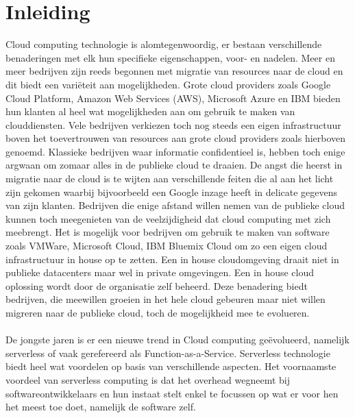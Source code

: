 \chapter{Inleiding}
\label{ch:inleiding}

Cloud computing technologie is alomtegenwoordig, er bestaan verschillende benaderingen met elk hun specifieke eigenschappen, voor- en nadelen. Meer en meer bedrijven zijn reeds begonnen met migratie van resources naar de cloud en dit biedt een variëteit aan mogelijkheden. Grote cloud providers zoals Google Cloud Platform, Amazon Web Services (AWS), Microsoft Azure en IBM bieden hun klanten al heel wat mogelijkheden aan om gebruik te maken van clouddiensten. Vele bedrijven verkiezen toch nog steeds een eigen infrastructuur boven het toevertrouwen van resources aan grote cloud providers zoals hierboven genoemd. Klassieke bedrijven waar informatie confidentieel is, hebben toch enige argwaan om zomaar alles in de publieke cloud te draaien. De angst die heerst in migratie naar de cloud is te wijten aan verschillende feiten die al aan het licht zijn gekomen waarbij bijvoorbeeld een Google inzage heeft in delicate gegevens van zijn klanten. Bedrijven die enige afstand willen nemen van de publieke cloud kunnen toch meegenieten van de veelzijdigheid dat cloud computing met zich meebrengt. Het is mogelijk voor bedrijven om gebruik te maken van software zoals VMWare, Microsoft Cloud, IBM Bluemix Cloud om zo een eigen cloud infrastructuur in house op te zetten. Een in house cloudomgeving draait niet in publieke datacenters maar wel in private omgevingen. Een in house cloud oplossing wordt door de organisatie zelf beheerd. Deze benadering biedt bedrijven, die meewillen groeien in het hele cloud gebeuren maar niet willen migreren naar de publieke cloud, toch de mogelijkheid mee te evolueren.
\\\\
De jongste jaren is er een nieuwe trend in Cloud computing geëvolueerd, namelijk serverless of vaak gerefereerd als Function-as-a-Service. Serverless technologie biedt heel wat voordelen op basis van verschillende aspecten. Het voornaamste voordeel van serverless computing is dat het overhead wegneemt bij softwareontwikkelaars en hun instaat stelt enkel te focussen op wat er voor hen het meest toe doet, namelijk de software zelf.
\\\\
